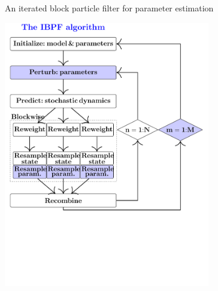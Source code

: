 \documentclass{beamer}
\begin{document}
\begin{frame}{An iterated block particle filter for parameter estimation}


  \begin{center}
    
  \includegraphics[trim={0 0 0 10mm},clip,width=9cm]{IBPF_workflow.pdf}


  \end{center}
  
\end{frame}
\end{document}
